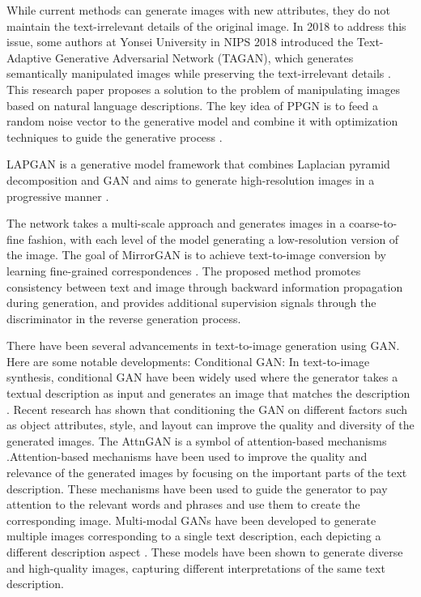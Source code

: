 \documentclass[runningheads, orivec]{llncs}
\begin{document}
While current methods can generate images with new attributes, they do not maintain the text-irrelevant details of the original image. In 2018 to address this issue, some authors at Yonsei University in NIPS 2018 introduced the Text-Adaptive Generative Adversarial Network (TAGAN), which generates semantically manipulated images while preserving the text-irrelevant details \cite{nam2018text}. This research paper proposes a solution to the problem of manipulating images based on natural language descriptions. The key idea of PPGN is to feed a random noise vector to the generative model and combine it with optimization techniques to guide the generative process \cite{nguyen2017plug}. 

LAPGAN is a generative model framework that combines Laplacian pyramid decomposition and GAN and aims to generate high-resolution images in a progressive manner \cite{denton2015deep}.



The network takes a multi-scale approach and generates images in a coarse-to-fine fashion, with each level of the model generating a low-resolution version of the image. The goal of MirrorGAN is to achieve text-to-image conversion by learning fine-grained correspondences \cite{qiao2019mirrorgan}. The proposed method promotes consistency between text and image through backward information propagation during generation, and provides additional supervision signals through the discriminator in the reverse generation process.

There have been several advancements in text-to-image generation using GAN. Here are some notable developments: Conditional GAN: In text-to-image synthesis, conditional GAN have been widely used where the generator takes a textual description as input and generates an image that matches the description \cite{mirza2014conditional}. Recent research has shown that conditioning the GAN on different factors such as object attributes, style, and layout can improve the quality and diversity of the generated images. The AttnGAN is a symbol of attention-based mechanisms \cite{xu2018attngan}.Attention-based mechanisms have been used to improve the quality and relevance of the generated images by focusing on the important parts of the text description. These mechanisms have been used to guide the generator to pay attention to the relevant words and phrases and use them to create the corresponding image. Multi-modal GANs have been developed to generate multiple images corresponding to a single text description, each depicting a different description aspect \cite{amirian2019social}. These models have been shown to generate diverse and high-quality images, capturing different interpretations of the same text description.
\end{document}
